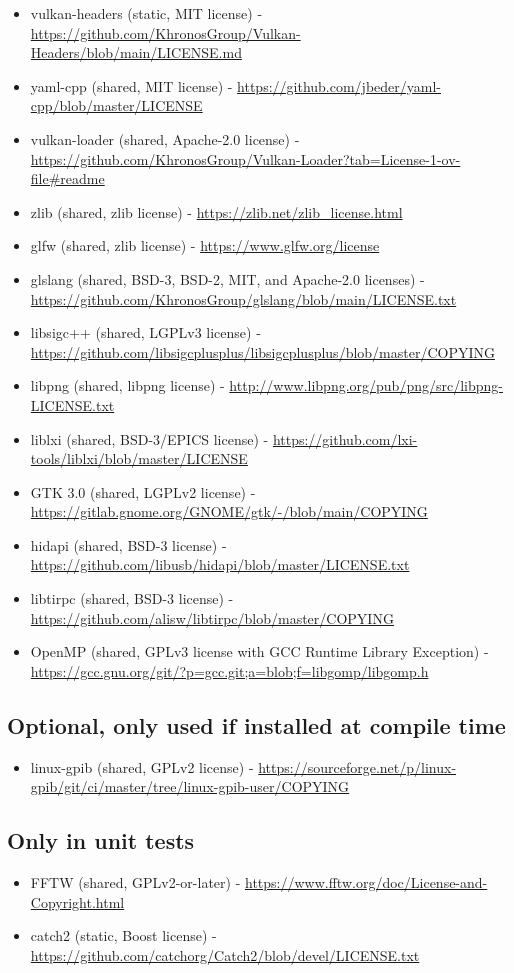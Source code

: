 \begin{itemize}
\item vulkan-headers (static, MIT license) - \url{https://github.com/KhronosGroup/Vulkan-Headers/blob/main/LICENSE.md}
\item yaml-cpp (shared, MIT license) - \url{https://github.com/jbeder/yaml-cpp/blob/master/LICENSE}
\item vulkan-loader (shared, Apache-2.0 license) - \url{https://github.com/KhronosGroup/Vulkan-Loader?tab=License-1-ov-file#readme}
\item zlib (shared, zlib license) - \url{https://zlib.net/zlib_license.html}
\item glfw (shared, zlib license) - \url{https://www.glfw.org/license}
\item glslang (shared, BSD-3, BSD-2, MIT, and Apache-2.0 licenses) - \url{https://github.com/KhronosGroup/glslang/blob/main/LICENSE.txt}
\item libsigc++ (shared, LGPLv3 license) - \url{https://github.com/libsigcplusplus/libsigcplusplus/blob/master/COPYING}
\item libpng (shared, libpng license) - \url{http://www.libpng.org/pub/png/src/libpng-LICENSE.txt}
\item liblxi (shared, BSD-3/EPICS license) - \url{https://github.com/lxi-tools/liblxi/blob/master/LICENSE}
\item GTK 3.0 (shared, LGPLv2 license) - \url{https://gitlab.gnome.org/GNOME/gtk/-/blob/main/COPYING}
\item hidapi (shared, BSD-3 license) - \url{https://github.com/libusb/hidapi/blob/master/LICENSE.txt}
\item libtirpc (shared, BSD-3 license) - \url{https://github.com/alisw/libtirpc/blob/master/COPYING}
\item OpenMP (shared, GPLv3 license with GCC Runtime Library Exception) - \url{https://gcc.gnu.org/git/?p=gcc.git;a=blob;f=libgomp/libgomp.h}
\end{itemize}

\subsection{Optional, only used if installed at compile time}
\begin{itemize}
\item linux-gpib (shared, GPLv2 license) - \url{https://sourceforge.net/p/linux-gpib/git/ci/master/tree/linux-gpib-user/COPYING}
\end{itemize}

\subsection{Only in unit tests}
\begin{itemize}
\item FFTW (shared, GPLv2-or-later) - \url{https://www.fftw.org/doc/License-and-Copyright.html}
\item catch2 (static, Boost license) - \url{https://github.com/catchorg/Catch2/blob/devel/LICENSE.txt}
\end{itemize}
